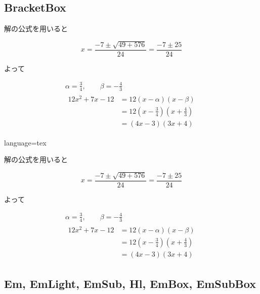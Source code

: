 \documentclass[../main]{subfiles}
\begin{document}
\subsection{BracketBox}
\begin{BracketBox}

    解の公式を用いると

    \begin{equation}
        x = \frac{-7\pm\sqrt{49+576}}{24} = \frac{-7\pm25}{24}
    \end{equation}

    よって

    \begin{gather}
        \alpha = \frac{3}{4}, \qquad \beta = -\frac{4}{3} \\
        \begin{aligned}
            12x^2+7x-12 &= 12(x-\alpha)(x-\beta) \\
                    &= 12(x-\frac{3}{4})(x+\frac{4}{3}) \\
                    &= (4x-3)(3x+4)
        \end{aligned}
    \end{gather}

\end{BracketBox}
\begin{Code}{language=tex}
\begin{BracketBox}

    解の公式を用いると

    \begin{equation}
        x = \frac{-7\pm\sqrt{49+576}}{24} = \frac{-7\pm25}{24}
    \end{equation}

    よって

    \begin{gather}
        \alpha = \frac{3}{4}, \qquad \beta = -\frac{4}{3} \\
        \begin{aligned}
            12x^2+7x-12 &= 12(x-\alpha)(x-\beta) \\
                    &= 12(x-\frac{3}{4})(x+\frac{4}{3}) \\
                    &= (4x-3)(3x+4)
        \end{aligned}
    \end{gather}
\end{BracketBox}
\end{Code}

\subsection{Em, EmLight, EmSub, Hl, EmBox, EmSubBox}
\end{document}
